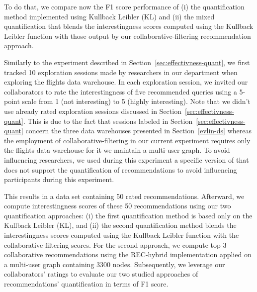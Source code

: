 To do that, we compare now the F1 score performance of (i) the quantification method implemented using Kullback Leibler (KL) and (ii) the mixed quantification that blends the interestingness scores computed using the Kullback Leibler function with those output by our collaborative-filtering recommendation approach.
 
Similarly to the experiment described in Section~\ref{sec:effectivness-quant}, we first tracked 10 exploration sessions made by researchers in our department when exploring the flights data warehouse. In each exploration session, we invited our collaborators to rate the interestingness of five recommended queries using a 5-point scale from 1 (not interesting) to 5 (highly interesting).  
Note that we didn't use already rated exploration sessions discussed in Section~\ref{sec:effectivness-quant}. This is due to the fact that sessions labeled in Section~\ref{sec:effectivness-quant} concern the three data warehouses presented in Section~\ref{evlin-ds} whereas the employment of collaborative-filtering in our current experiment requires only the flights data warehouse for it we maintain a multi-user graph.
To avoid influencing researchers, we used during this experiment a specific version of \prototype{} that does not support the quantification of recommendations to avoid influencing participants during this experiment.


This results in a data set containing 50 rated recommendations. 
Afterward, we compute interestingness scores of these 50 recommendations using our two quantification approaches: (i) the first quantification method is based only on the Kullback Leibler (KL), and (ii) the second quantification method blends the interestingness scores computed using the Kullback Leibler function with the collaborative-filtering scores.
For the second approach, we compute top-3 collaborative recommendations using the REC-hybrid implementation applied on a multi-user graph containing 3300 nodes.
Subsequently, we leverage our collaborators' ratings to evaluate our two studied  approaches of recommendations' quantification in terms of F1 score. %

